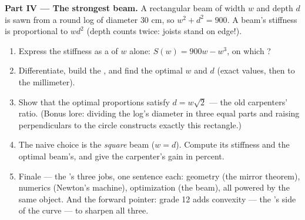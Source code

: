 \begin{problem}
\medskip
\noindent\textbf{Part IV --- The strongest beam.}
A rectangular beam of width $w$ and depth $d$ is sawn from a
round log of diameter $30$ cm, so $w^2 + d^2 = 900$. A beam's
stiffness is proportional to $w d^2$ (depth counts twice:
joists stand on edge!).
\begin{enumerate}[resume]
  \item Express the stiffness as a  of $w$ alone:
        $S(w) = 900w - w^3$, on which ?
  \item Differentiate, build the , and find the
        optimal $w$ and $d$ (exact values, then to the
        millimeter).
  \item Show that the optimal proportions satisfy
        $d = w\sqrt2$ --- the old carpenters' ratio. (Bonus
        lore: dividing the log's diameter in three equal parts
        and raising perpendiculars to the circle constructs
        exactly this rectangle.)
  \item The naive choice is the \emph{square} beam
        ($w = d$). Compute its stiffness and the optimal
        beam's, and give the carpenter's gain in percent.
  \item Finale --- the 's three jobs, one sentence each:
        geometry (the mirror theorem), numerics (Newton's
        machine), optimization (the beam), all powered by the
        same object. And the forward pointer: grade 12 adds
        convexity --- the 's side of the curve --- to
        sharpen all three.
\end{enumerate}
\end{problem}
